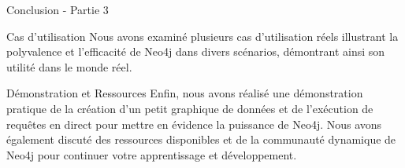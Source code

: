 \begin{frame}{Conclusion - Partie 3}
  \begin{block}{Cas d'utilisation}
    Nous avons examiné plusieurs cas d'utilisation réels illustrant la polyvalence et l'efficacité de Neo4j dans divers scénarios, démontrant ainsi son utilité dans le monde réel.
  \end{block}
  
  \begin{block}{Démonstration et Ressources}
    Enfin, nous avons réalisé une démonstration pratique de la création d'un petit graphique de données et de l'exécution de requêtes en direct pour mettre en évidence la puissance de Neo4j. Nous avons également discuté des ressources disponibles et de la communauté dynamique de Neo4j pour continuer votre apprentissage et développement.
  \end{block}
\end{frame}